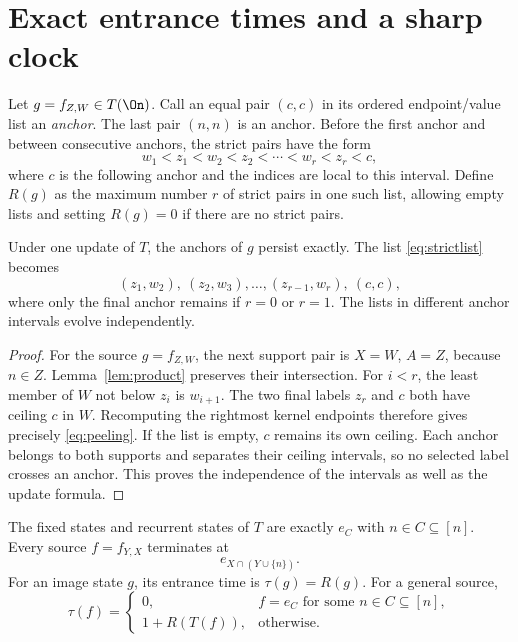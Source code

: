 \section{Exact entrance times and a sharp clock}\label{sec:clock}

Let $g=f_{Z,W}\in T(\On)$. Call an equal pair $(c,c)$ in its ordered
endpoint/value list an \emph{anchor}. The last pair $(n,n)$ is an
anchor. Before the first anchor and between consecutive anchors, the
strict pairs have the form
\begin{equation}\label{eq:strictlist}
 w_1<z_1<w_2<z_2<\cdots<w_r<z_r<c,
\end{equation}
where $c$ is the following anchor and the indices are local to this
interval. Define $R(g)$ as the maximum number $r$ of strict pairs in
one such list, allowing empty lists and setting $R(g)=0$ if there are
no strict pairs.

\begin{lemma}\label{lem:peeling}
Under one update of $T$, the anchors of $g$ persist exactly. The list
\eqref{eq:strictlist} becomes
\begin{equation}\label{eq:peeling}
 (z_1,w_2),\ (z_2,w_3),\ldots,(z_{r-1},w_r),\ (c,c),
\end{equation}
where only the final anchor remains if $r=0$ or $r=1$.
The lists in different anchor intervals evolve independently.
\end{lemma}

\begin{proof}
For the source $g=f_{Z,W}$, the next support pair is $X=W$, $A=Z$,
because $n\in Z$. Lemma~\ref{lem:product} preserves their intersection.
For $i<r$, the least member of $W$ not below $z_i$ is $w_{i+1}$.
The two final labels $z_r$ and $c$ both have ceiling $c$ in $W$.
Recomputing the rightmost kernel endpoints therefore gives precisely
\eqref{eq:peeling}. If the list is empty, $c$ remains its own ceiling.
Each anchor belongs to both supports and separates their ceiling
intervals, so no selected label crosses an anchor. This proves the
independence of the intervals as well as the update formula.
\end{proof}

\begin{theorem}\label{thm:time}
The fixed states and recurrent states of $T$ are exactly
$e_C$ with $n\in C\subseteq[n]$. Every source $f=f_{Y,X}$ terminates at
\begin{equation}\label{eq:terminal}
 e_{X\cap(Y\cup\{n\})}.
\end{equation}
For an image state $g$, its entrance time is $\tau(g)=R(g)$. For a
general source,
\begin{equation}\label{eq:time}
 \tau(f)=
 \begin{cases}
 0,& f=e_C\text{ for some }n\in C\subseteq[n],\\
 1+R(T(f)),&\text{otherwise}.
 \end{cases}
\end{equation}
\end{theorem}

